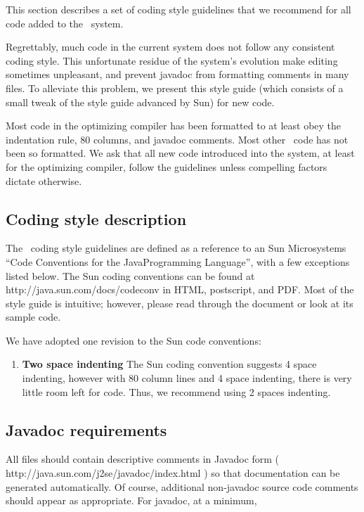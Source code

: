 This section describes a set of coding style guidelines that we
recommend for all code added to the \jp\  system.  

Regrettably, much code in the current system does not follow any consistent
coding style.  This unfortunate residue of the system's evolution 
make editing sometimes unpleasant, and prevent javadoc from formatting comments
in
many files.  To alleviate this problem, we present this style guide 
(which consists of a small tweak of the style guide advanced by Sun) 
for new code. 

Most code in the optimizing compiler has been formatted to at least obey 
the indentation rule, 80 columns, and javadoc comments.  Most other \jp\ code
has not been so formatted. We ask that all new code introduced
into the system, at least for the optimizing compiler, follow the 
guidelines unless compelling factors dictate otherwise.  

\subsection {Coding style description}

The \jp\ coding style guidelines are defined as a reference to an Sun
Microsystems ``Code Conventions for the Java\trademark Programming Language'',
with a few exceptions listed below.  The Sun coding
conventions can be found at 
{http://java.sun.com/docs/codeconv} in HTML,
postscript, and PDF.  Most of the style guide is intuitive; 
however, please read through the document or look at its sample code.

We have adopted one revision to the Sun code conventions:
\begin{enumerate}
\item {\bf Two space indenting} The Sun coding convention suggests 4
space indenting, however with 80 column lines and 4 space indenting,
there is very little room left for code.  Thus, we recommend using 2
spaces indenting.

\end{enumerate}

\subsection {Javadoc requirements}

All files should contain descriptive comments
in Javadoc form (
{http://java.sun.com/j2se/javadoc/index.html}
) so
that documentation can be generated automatically.  Of course,
additional non-javadoc source code comments should appear as
appropriate.
For javadoc, at a minimum,

